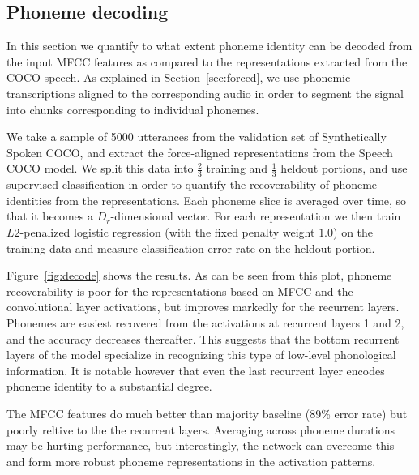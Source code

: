 \subsection{Phoneme decoding}
\label{sec:decoding}
In this section we quantify to what extent phoneme identity can be
decoded from  the input MFCC features as compared to the
representations extracted from the COCO speech. As explained in 
Section~\ref{sec:forced}, we use phonemic
transcriptions aligned to the corresponding audio in order to segment
 the signal into chunks corresponding to individual phonemes.

We take a sample of 5000 utterances from the validation set of
Synthetically Spoken COCO, and extract the force-aligned
representations from the Speech COCO model.
We split this data into $\frac{2}{3}$ training and
$\frac{1}{3}$ heldout portions, and use supervised classification in
order to quantify the recoverability of phoneme identities from the
representations. Each phoneme slice is averaged over time, so that it
becomes a $D_r$-dimensional vector. For each representation we then
train $L2$-penalized logistic regression (with the fixed penalty
weight $1.0$) on the training data and measure classification error rate
on the heldout portion. 

Figure~\ref{fig:decode} shows the results. As can be seen from this plot, phoneme recoverability 
is poor for the representations based on MFCC and the convolutional layer activations, but improves markedly for 
the recurrent layers. Phonemes are easiest recovered from the activations at recurrent
layers 1 and 2, and the accuracy decreases thereafter. This suggests
that the bottom recurrent layers of the model specialize in recognizing this
type of low-level phonological information. It is notable however that
even the last recurrent layer encodes phoneme identity to a
substantial degree.

The MFCC features do much better than majority baseline (89\% error rate) but
poorly reltive to the the recurrent layers. Averaging across
phoneme durations may be hurting performance, but interestingly, the
network can overcome this and form more robust phoneme representations in 
the activation patterns.

